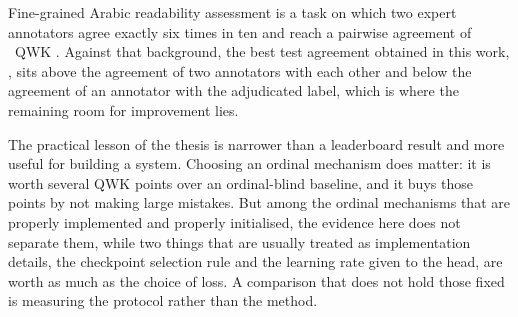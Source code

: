 Fine-grained Arabic readability assessment is a task on which two expert annotators agree
exactly six times in ten and reach a pairwise agreement of \iaaPairwiseQwk\ QWK
\cite{elmadani2025barec}. Against that background, the best test agreement obtained in this work,
\testQwkCoralHeadlr, sits above the agreement of two annotators with each other and below the
agreement of an annotator with the adjudicated label, which is where the remaining room for
improvement lies.

The practical lesson of the thesis is narrower than a leaderboard result and more useful for
building a system. Choosing an ordinal mechanism does matter: it is worth several QWK points
over an ordinal-blind baseline, and it buys those points by not making large mistakes. But
among the ordinal mechanisms that are properly implemented and properly initialised, the
evidence here does not separate them, while two things that are usually treated as
implementation details, the checkpoint selection rule and the learning rate given to the head,
are worth as much as the choice of loss. A comparison that does not hold those fixed is
measuring the protocol rather than the method.
